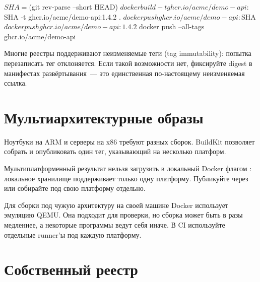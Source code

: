 \begin{code}[language=bash]
$ SHA=$(git rev-parse --short HEAD)
$ docker build -t ghcr.io/acme/demo-api:$SHA -t ghcr.io/acme/demo-api:1.4.2 .
$ docker push ghcr.io/acme/demo-api:$SHA
$ docker push ghcr.io/acme/demo-api:1.4.2
$ docker push --all-tags ghcr.io/acme/demo-api
\end{code}

\begin{notebox}
Многие реестры поддерживают неизменяемые теги (tag immutability):
попытка перезаписать тег отклоняется. Если такой возможности нет,
фиксируйте digest в манифестах развёртывания~--- это единственная
по-настоящему неизменяемая ссылка.
\end{notebox}

\section{Мультиархитектурные образы}

Ноутбуки на ARM и серверы на x86 требуют разных сборок. BuildKit
позволяет собрать и опубликовать один тег, указывающий на несколько
платформ.


\begin{warnbox}
Мультиплатформенный результат нельзя загрузить в локальный Docker
флагом : локальное хранилище поддерживает только одну
платформу. Публикуйте через  или собирайте под свою
платформу отдельно.
\end{warnbox}

\begin{tipbox}
Для сборки под чужую архитектуру на своей машине Docker использует
эмуляцию QEMU. Она подходит для проверки, но сборка может быть
в разы медленнее, а некоторые программы ведут себя иначе. В CI
используйте отдельные runner'ы под каждую платформу.
\end{tipbox}

\section{Собственный реестр}

